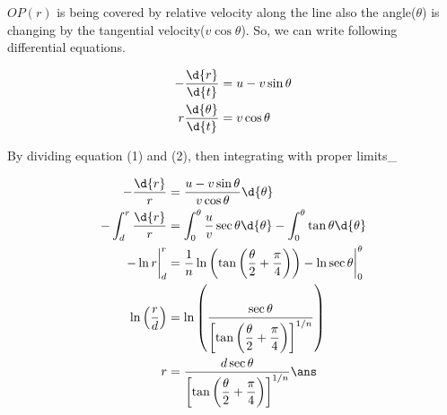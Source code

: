 \documentclass{article}
\begin{document}
$OP(r)$ is being covered by relative velocity along the line also the angle($\theta$) is changing by the tangential velocity($v\cos\theta$). So, we can write following differential equations.

\addtolength{\jot}{3ex}
\begin{align}
-\dfrac{\d{r}}{\d{t}} &= u - v\sin\theta \\
r\dfrac{\d{\theta}}{\d{t}} &= v\cos\theta
\end{align}
\pagebreak

By dividing equation (1) and (2), then integrating with proper limits\_ 

\begin{align*}
-\dfrac{\d{r}}{r} &= \dfrac{u-v\sin\theta}{v\cos\theta} \d{\theta}\\
-\int_d^r \dfrac{\d{r}}{r} &= \int_0^\theta \dfrac{u}{v}\sec\theta \d{\theta}- \int_0^\theta \tan\theta \d{\theta}\\
-\ln r \bigg\rvert_d^r &= \dfrac{1}{n} \ln \left(\tan\left(\dfrac{\theta}{2} + \dfrac{\pi}{4} \right)\right)-\ln\sec\theta \bigg\rvert_0^\theta\\
\ln\left(\dfrac{r}{d}\right) &= \ln\left(\dfrac{\sec\theta}{\left[ \tan\left(\dfrac{\theta}{2} + \dfrac{\pi}{4} \right) \right]^{1/n}}\right) \\
r &= \dfrac{d\sec\theta}{\left[ \tan\left(\dfrac{\theta}{2} + \dfrac{\pi}{4} \right) \right]^{1/n}} \ans
\end{align*}

\pagebreak

\vspace*{\fill}
\begin{center}
	\fbox{\qrcode[height=2cm]{\gdrive}}
\end{center}
\vspace*{\fill}
\end{document}
